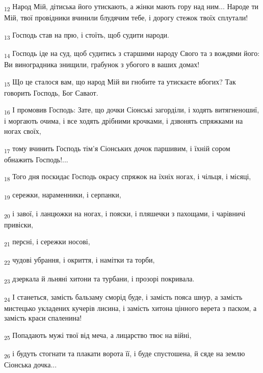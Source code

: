 \begin{tcolorbox}
\textsubscript{12} Народ Мій, дітиська його утискають, а жінки мають гору над ним... Народе ти Мій, твої провідники вчинили блудячим тебе, і дорогу стежок твоїх сплутали!
\end{tcolorbox}
\begin{tcolorbox}
\textsubscript{13} Господь став на прю, і стоїть, щоб судити народи.
\end{tcolorbox}
\begin{tcolorbox}
\textsubscript{14} Господь іде на суд, щоб судитись з старшими народу Свого та з вождями його: Ви виноградника знищили, грабунок з убогого в ваших домах!
\end{tcolorbox}
\begin{tcolorbox}
\textsubscript{15} Що це сталося вам, що народ Мій ви гнобите та утискаєте вбогих? Так говорить Господь, Бог Саваот.
\end{tcolorbox}
\begin{tcolorbox}
\textsubscript{16} І промовив Господь: Зате, що дочки Сіонські загорділи, і ходять витягненошиї, і моргають очима, і все ходять дрібними крочками, і дзвонять спряжками на ногах своїх,
\end{tcolorbox}
\begin{tcolorbox}
\textsubscript{17} тому вчинить Господь тім'я Сіонських дочок паршивим, і їхній сором обнажить Господь!...
\end{tcolorbox}
\begin{tcolorbox}
\textsubscript{18} Того дня поскидає Господь окрасу спряжок на їхніх ногах, і чільця, і місяці,
\end{tcolorbox}
\begin{tcolorbox}
\textsubscript{19} сережки, нараменники, і серпанки,
\end{tcolorbox}
\begin{tcolorbox}
\textsubscript{20} і завої, і ланцюжки на ногах, і пояски, і пляшечки з пахощами, і чарівничі привіски,
\end{tcolorbox}
\begin{tcolorbox}
\textsubscript{21} персні, і сережки носові,
\end{tcolorbox}
\begin{tcolorbox}
\textsubscript{22} чудові убрання, і окриття, і намітки та торби,
\end{tcolorbox}
\begin{tcolorbox}
\textsubscript{23} дзеркала й льняні хитони та турбани, і прозорі покривала.
\end{tcolorbox}
\begin{tcolorbox}
\textsubscript{24} І станеться, замість бальзаму сморід буде, і замість пояса шнур, а замість мистецько укладених кучерів лисина, і замість хитона цінного верета з паском, а замість краси спаленина!
\end{tcolorbox}
\begin{tcolorbox}
\textsubscript{25} Попадають мужі твої від меча, а лицарство твоє на війні,
\end{tcolorbox}
\begin{tcolorbox}
\textsubscript{26} і будуть стогнати та плакати ворота її, і буде спустошена, й сяде на землю Сіонська дочка...
\end{tcolorbox}
